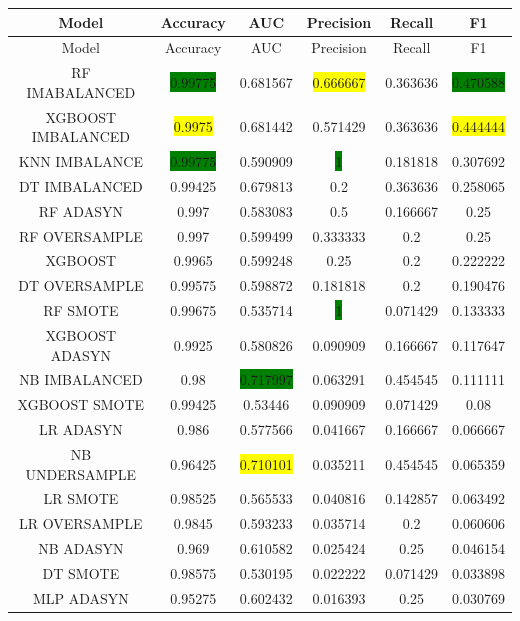   \begin{longtable}{|c|c|c|c|c|c|}
  	\hline
  	Model & Accuracy & AUC & Precision & Recall & F1\\ \hline
  	\endfirsthead
  	\hline
  	Model & Accuracy & AUC & Precision & Recall & F1\\ \hline
  	\endhead
  	RF IMABALANCED & \colorbox{green}{0.99775} & 0.681567 & \colorbox{yellow}{0.666667} & 0.363636 & \colorbox{green}{0.470588}\\ \hline
  	XGBOOST IMBALANCED & \colorbox{yellow}{0.9975} & 	0.681442 & 0.571429 & 0.363636 & \colorbox{yellow}{0.444444}\\ \hline
  	KNN IMBALANCE & \colorbox{green}{0.99775} & 0.590909 & \colorbox{green}{1} & 0.181818 & 0.307692\\ \hline
  	DT IMBALANCED & 0.99425 & 0.679813 & 0.2 & 0.363636 & 0.258065\\ \hline
  	RF ADASYN & 0.997 & 0.583083 & 0.5 & 0.166667 & 0.25\\ \hline
  	RF OVERSAMPLE & 0.997 & 0.599499 & 0.333333 & 0.2 & 0.25\\ \hline
  	XGBOOST  & 0.9965 & 0.599248 & 0.25 & 0.2 & 0.222222\\ \hline
  	DT OVERSAMPLE & 0.99575 & 0.598872 & 0.181818 & 0.2 & 0.190476\\ \hline
  	RF SMOTE & 0.99675 & 0.535714 & \colorbox{green}{1} & 0.071429 & 0.133333\\ \hline
  	XGBOOST ADASYN  & 0.9925 & 0.580826 & 0.090909 & 0.166667 & 0.117647\\ \hline
  	NB IMBALANCED & 0.98 & \colorbox{green}{0.717997} & 0.063291 & 0.454545 & 0.111111\\ \hline
  	XGBOOST SMOTE & 0.99425 & 0.53446 & 0.090909 & 0.071429 & 0.08\\ \hline
  	LR ADASYN  & 0.986 & 0.577566 & 0.041667 & 0.166667 & 0.066667\\ \hline
  	NB UNDERSAMPLE & 0.96425 & \colorbox{yellow}{0.710101} & 0.035211 & 0.454545 & 0.065359\\ \hline
  	LR SMOTE & 0.98525 & 0.565533 & 0.040816 & 0.142857 & 0.063492\\ \hline
  	LR OVERSAMPLE & 0.9845 & 0.593233 & 0.035714 & 0.2 & 0.060606\\ \hline
  	NB ADASYN & 0.969 & 0.610582 & 0.025424 & 0.25 & 0.046154\\ \hline
  	DT SMOTE & 0.98575 & 0.530195 & 0.022222 & 0.071429 & 0.033898\\ \hline
  	MLP  ADASYN & 0.95275 & 0.602432 & 0.016393 & 0.25 & 0.030769\\ \hline

\end{longtable}
